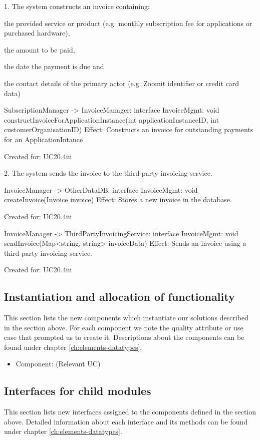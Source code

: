         1. The system constructs an invoice containing:
            { the provided service or product (e.g. monthly subscription fee for applications or purchased hardware),
            { the amount to be paid,
            { the date the payment is due and
            { the contact details of the primary actor (e.g. Zoomit identifier or credit card data)

                SubscriptionManager -> InvoiceManager: interface InvoiceMgmt: void constructInvoiceForApplicationInstance(int applicationInstanceID, int customerOrganisationID)
                    Effect: Constructs an invoice for outstanding payments for an ApplicationIntance
                    \item Created for: UC20.4iii

        2. The system sends the invoice to the third-party invoicing service.

            InvoiceManager -> OtherDataDB: interface InvoiceMgmt: void createInvoice(Invoice invoice)
                    Effect: Stores a new invoice in the database.
                    \item Created for: UC20.4iii

            InvoiceManager -> ThirdPartyInvoicingService: interface InvoiceMgmt: void sendInvoice(Map<string, string> invoiceData)
                    Effect: Sends an invoice using a third party invoicing service.
                    \item Created for: UC20.4iii
               


\subsection{Instantiation and allocation of functionality}
    This section lists the new components which instantiate our solutions
    described in the section above. For each component we note the quality
    attribute or use case that prompted us to create it. Descriptions about
    the components can be found under chapter \ref{ch:elements-datatypes}. \\

    \begin{itemize}
        \item Component: (Relevant UC)
    \end{itemize}


\subsection{Interfaces for child modules}
    This section lists new interfaces assigned to the components defined
    in the section above. Detailed information about each interface and
    its methods can be found under chapter \ref{ch:elements-datatypes}. \\

}}}}
